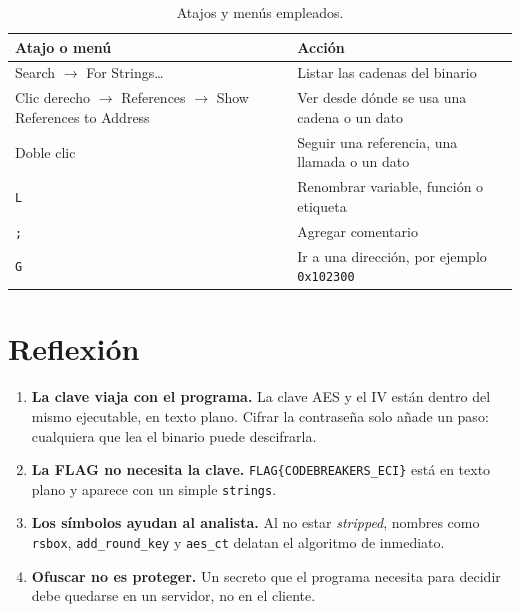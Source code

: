 \documentclass[journal]{IEEEtran}
\begin{document}
\begin{table}[H]
\centering
\caption{Atajos y men\'us empleados.}
\footnotesize
\begin{tabular}{@{}p{1.5in} p{1.4in}@{}}
\hline
Atajo o men\'u & Acci\'on \\ \hline
Search $\rightarrow$ For Strings\ldots{} & Listar las cadenas del binario \\
Clic derecho $\rightarrow$ References $\rightarrow$ Show References to Address & Ver desde d\'onde se usa una cadena o un dato \\
Doble clic & Seguir una referencia, una llamada o un dato \\
\texttt{L} & Renombrar variable, funci\'on o etiqueta \\
\texttt{;} & Agregar comentario \\
\texttt{G} & Ir a una direcci\'on, por ejemplo \texttt{0x102300} \\ \hline
\end{tabular}
\end{table}

\section{Reflexi\'on}

\begin{enumerate}
  \item \textbf{La clave viaja con el programa.} La clave AES y el IV est\'an
        dentro del mismo ejecutable, en texto plano. Cifrar la contrase\~na solo
        a\~nade un paso: cualquiera que lea el binario puede descifrarla.
  \item \textbf{La FLAG no necesita la clave.}
        \texttt{FLAG\{CODEBREAKERS\_\allowbreak{}ECI\}} est\'a en texto plano y aparece con un
        simple \texttt{strings}.
  \item \textbf{Los s\'imbolos ayudan al analista.} Al no estar \textit{stripped},
        nombres como \texttt{rsbox}, \texttt{add\_\allowbreak{}round\_\allowbreak{}key} y \texttt{aes\_\allowbreak{}ct}
        delatan el algoritmo de inmediato.
  \item \textbf{Ofuscar no es proteger.} Un secreto que el programa necesita para
        decidir debe quedarse en un servidor, no en el cliente.
\end{enumerate}
\end{document}
